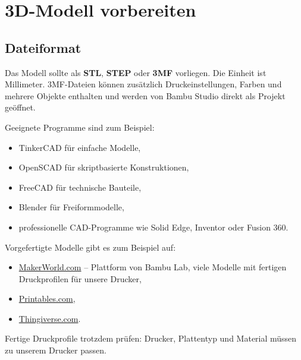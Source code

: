 \documentclass{\basedir/fablab-document}
\begin{document}
	
	\newpage
	
	
	\renewcommand{\contentsname}{Inhaltsverzeichnis / Arbeitsablauf}
	\setcounter{tocdepth}{2}
	\tableofcontents
	\newpage
	
	\section{3D-Modell vorbereiten}
	
	\subsection{Dateiformat}
	
	Das Modell sollte als \textbf{STL}, \textbf{STEP} oder \textbf{3MF} vorliegen. Die Einheit ist Millimeter. 3MF-Dateien können zusätzlich Druckeinstellungen, Farben und mehrere Objekte enthalten und werden von Bambu Studio direkt als Projekt geöffnet.
	
	Geeignete Programme sind zum Beispiel:
	\begin{itemize}
		\item TinkerCAD für einfache Modelle,
		\item OpenSCAD für skriptbasierte Konstruktionen,
		\item FreeCAD für technische Bauteile,
		\item Blender für Freiformmodelle,
		\item professionelle CAD-Programme wie Solid Edge, Inventor oder Fusion 360.
	\end{itemize}
	
	Vorgefertigte Modelle gibt es zum Beispiel auf:
	\begin{itemize}
		\item \href{https://makerworld.com}{MakerWorld.com} -- Plattform von Bambu Lab, viele Modelle mit fertigen Druckprofilen für unsere Drucker,
		\item \href{https://www.printables.com}{Printables.com},
		\item \href{https://www.thingiverse.com}{Thingiverse.com}.
	\end{itemize}
	Fertige Druckprofile trotzdem prüfen: Drucker, Plattentyp und Material müssen zu unserem Drucker passen.
	
\end{document}
